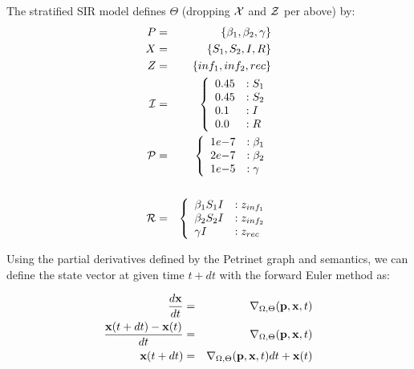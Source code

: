 \begin{example}\label{ex:base}
    The stratified SIR model defines $\Theta$ (dropping ${\cal X}$ and ${\cal
    Z}$ per above) by:
    \begin{eqnarray*}
        P &=& \{\beta_1, \beta_2, \gamma\}\\
        X &=& \{S_1, S_2, I, R\}\\
        Z &=& \{inf_1, inf_2, rec\}\\
        {\cal I} &=& \left\{ 
            \begin{array}{ll}
                0.45& :S_1\\
                0.45& :S_2\\
                0.1& :I\\
                0.0& :R
            \end{array}\right.\\
        {\cal P}&=& \left\{ 
            \begin{array}{ll}
                1e{-7}& :\beta_1\\
                2e{-7}& :\beta_2\\
                1e{-5}& :\gamma
            \end{array}\right.\\
            \\
        {\cal R} &=& \left\{ 
            \begin{array}{ll}
                \beta_1 S_1 I & : z_{inf_1}\\
                \beta_2 S_2 I & : z_{inf_2}\\
                \gamma I & : z_{rec}\\
            \end{array}\right.\\
    \end{eqnarray*}
\end{example}


Using the partial derivatives defined by the Petrinet graph and semantics, we
can define the state vector at given time $t+dt$ with the forward Euler method
as:

\begin{eqnarray*}
    \frac{d {\bf x}}{dt} &=& \nabla_{\Omega, \Theta}({\bf p},{\bf x}, t)\\
    \frac{{\bf x}(t+dt)-{\bf x}(t)}{dt} &=& \nabla_{\Omega, \Theta}({\bf p},{\bf x},
    t)\\
    {\bf x}(t+dt)&=& \nabla_{\Omega, \Theta}({\bf p},{\bf x}, t)dt+ {\bf x}(t)
\end{eqnarray*}

